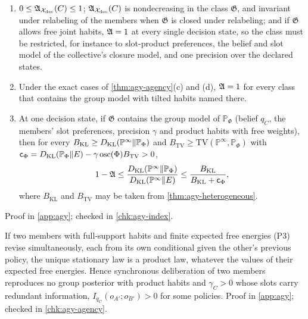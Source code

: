 \begin{proposition}\label{prop:agy-index}
\begin{enumerate}
\item[(a)] $0\le\mathfrak{A}_{\mathcal X_{\mathrm{dec}}}(C)\le1$; $\mathfrak{A}_{\mathcal X_{\mathrm{dec}}}(C)$ is nondecreasing in the class $\mathfrak G$, and invariant under relabeling of the members when $\mathfrak G$ is closed under relabeling; and if $\mathfrak G$ allows free joint habits, $\mathfrak{A}=1$ at every single decision state, so the class must be restricted, for instance to slot-product preferences, the belief and slot model of the collective's closure model, and one precision over the declared states.
\item[(b)] Under the exact cases of \cref{thm:agy-agency}(c) and (d), $\mathfrak{A}=1$ for every class that contains the group model with tilted habits named there.
\item[(c)] At one decision state, if $\mathfrak G$ contains the group model of $\mathbb P_\Phi$ (belief $q_C$, the members' slot preferences, precision $\gamma$ and product habits with free weights), then for every $B_{\mathrm{KL}}\ge D_{\mathrm{KL}}(\mathbb P^\infty\Vert\mathbb P_\Phi)$ and $B_{\mathrm{TV}}\ge\mathrm{TV}(\mathbb P^\infty,\mathbb P_\Phi)$ with $\mathsf c_\Phi=D_{\mathrm{KL}}(\mathbb P_\Phi\Vert E)-\gamma\operatorname{osc}(\Phi)B_{\mathrm{TV}}>0$,
\begin{equation}\label{eq:agy-index-bound}
1-\mathfrak{A}\le\frac{D_{\mathrm{KL}}(\mathbb P^\infty\Vert\mathbb P_\Phi)}{D_{\mathrm{KL}}(\mathbb P^\infty\Vert E)}\le\frac{B_{\mathrm{KL}}}{B_{\mathrm{KL}}+\mathsf c_\Phi},
\end{equation}
where $B_{\mathrm{KL}}$ and $B_{\mathrm{TV}}$ may be taken from \cref{thm:agy-heterogeneous}.
\end{enumerate}
Proof in \cref{app:agy}; checked in \cref{chk:agy-index}.
\end{proposition}

\begin{proposition}\label{prop:agy-synchronous}
If two members with full-support habits and finite expected free energies (P3) revise simultaneously, each from its own conditional given the other's previous policy, the unique stationary law is a product law, whatever the values of their expected free energies. Hence synchronous deliberation of two members reproduces no group posterior with product habits and $\gamma_C>0$ whose slots carry redundant information, $I_{q_C}(o_{A'};o_{B'})>0$ for some policies. Proof in \cref{app:agy}; checked in \cref{chk:agy-agency}.
\end{proposition}

